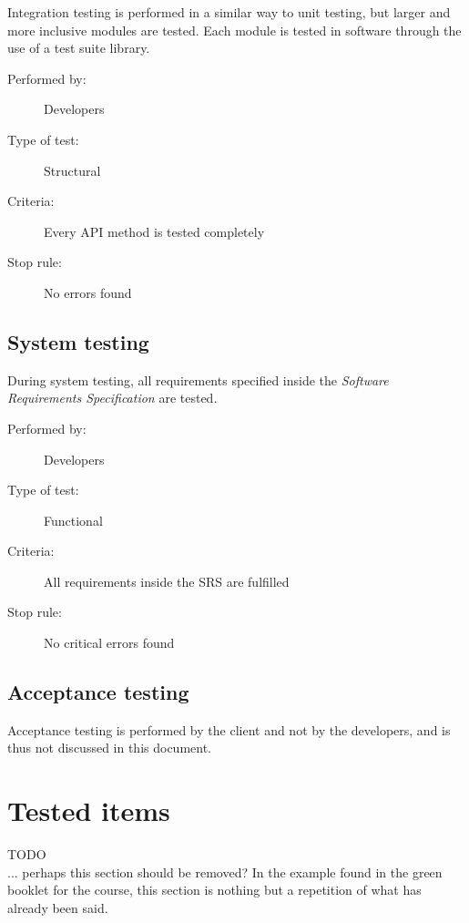 \documentclass[12pt,titlepage]{article}
\begin{document}
Integration testing is performed in a similar way to unit testing, but larger
and more inclusive modules are tested. Each module is tested in software through
the use of a test suite library.

\begin{description}
	\item[Performed by:]	Developers
	\item[Type of test:]	Structural
	\item[Criteria:]	Every API method is tested completely
	\item[Stop rule:]	No errors found
\end{description}


\subsection{System testing}
\label{subsec:test-process-system-testing}

During system testing, all requirements specified inside the \textit{Software
Requirements Specification} are tested.

\begin{description}
	\item[Performed by:]	Developers
	\item[Type of test:]	Functional
	\item[Criteria:]	All requirements inside the SRS are fulfilled
	\item[Stop rule:]	No critical errors found
\end{description}

\subsection{Acceptance testing}
\label{subsec:test-process-acceptance-testing}

Acceptance testing is performed by the client and not by the developers, and is
thus not discussed in this document.


\section{Tested items}
\label{sec:tested-items}

TODO \\

... perhaps this section should be removed? In the example found in the green
booklet for the course, this section is nothing but a repetition of what has
already been said.
\end{document}
